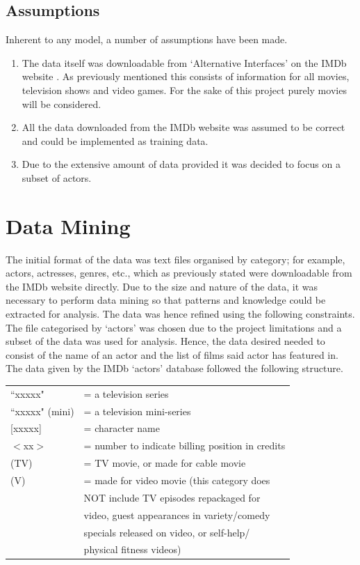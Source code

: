 \documentclass[12pt]{ieeeconf}      %
\begin{document}
\subsection{Assumptions}
\indent Inherent to any model, a number of assumptions have been made.
\begin{enumerate}
\item The data itself was downloadable from `Alternative Interfaces' on the IMDb website \cite{interfaces}. As previously mentioned this consists of information for all movies, television shows and video games. For the sake of this project purely movies will be considered.
\item All the data downloaded from the IMDb website was assumed to be correct and could be implemented as training data.
\item Due to the extensive amount of data provided it was decided to focus on a subset of actors.
\end{enumerate}


\section{Data Mining}
\indent The initial format of the data was text files organised by category; for example, actors, actresses, genres, etc., which as previously stated were downloadable from the IMDb website directly. Due to the size and nature of the data, it was necessary to perform data mining so that patterns and knowledge could be extracted for analysis. The data was hence refined using the following constraints.
\\
\indent The file categorised by `actors' was chosen due to the project limitations and a subset of the data was used for analysis. Hence, the data desired needed to consist of the name of an actor and the list of films said actor has featured in. The data given by the IMDb `actors' database followed the following structure.

\begin{table}[H]
\centering
\begin{tabular}{ll}
``xxxxx"        & = a television series \\
``xxxxx" (mini) & = a television mini-series \\
{[}xxxxx{]}    & = character name \\
$<$xx$>$       & = number to indicate billing position in credits \\
(TV)           & = TV movie, or made for cable movie \\
(V)            & = made for video movie (this category does \\
			   & NOT include TV episodes repackaged for \\
               & video, guest appearances in variety/comedy \\
               & specials released on video, or self-help/ \\ 
               & physical fitness videos)
               \label{structure}
\end{tabular}
\end{table}
\end{document}
